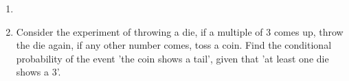 \begin{enumerate}[label=\thechapter.\arabic*,ref=\thechapter.\theenumi]
\item
\item Consider the experiment of throwing a die, if a multiple of 3 comes up, throw the die again, if any other number comes, toss a coin. Find the conditional probability of the event 'the coin shows a tail', given that 'at least one die shows a 3'.
\end{enumerate}
